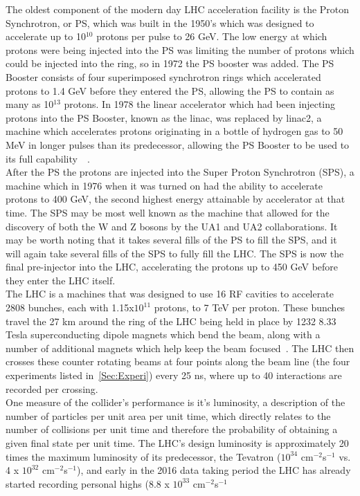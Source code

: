 The oldest component of the modern day LHC acceleration facility is the Proton Synchrotron, or PS, which was built in the 1950's which was designed to accelerate up to 10$^{10}$ protons per pulse to 26 GeV.  
The low energy at which protons were being injected into the PS was limiting the number of protons which could be injected into the ring, so in 1972 the PS booster was added.  
The PS Booster consists of four superimposed synchrotron rings which accelerated protons to 1.4 GeV before they entered the PS, allowing the PS to contain as many as 10$^{13}$ protons.  
In 1978 the linear accelerator which had been injecting protons into the PS Booster, known as the linac, was replaced by linac2, a machine which accelerates protons originating in a bottle of hydrogen gas to 50 MeV in longer pulses than its predecessor, allowing the PS Booster to be used to its full capability~\cite{PSHistory}~\cite{PSHistory2}.  \\

After the PS the protons are injected into the Super Proton Synchrotron (SPS), a machine which in 1976 when it was turned on had the ability to accelerate protons to 400 GeV, the second highest energy attainable by accelerator at that time.  
The SPS may be most well known as the machine that allowed for the discovery of both the W and Z bosons by the UA1 and UA2 collaborations.  
It may be worth noting that it takes several fills of the PS to fill the SPS, and it will again take several fills of the SPS to fully fill the LHC.  
The SPS is now the final pre-injector into the LHC, accelerating the protons up to 450 GeV before they enter the LHC itself.  \\

The LHC is a machines that was designed to use 16 RF cavities to accelerate 2808 bunches, each with 1.15x$10^{11}$ protons, to 7 TeV per proton.  
These bunches travel the 27 km around the ring of the LHC being held in place by 1232 8.33 Tesla superconducting dipole magnets which bend the beam, along with a number of additional magnets which help keep the beam focused~\cite{LHCTDR}.  
The LHC then crosses these counter rotating beams at four points along the beam line (the four experiments listed in~\ref{Sec:Experi}) every 25 ns, where up to 40 interactions are recorded per crossing.  \\

One measure of the collider's performance is it's luminosity, a description of the number of particles per unit area per unit time, which directly relates to the number of collisions per unit time and therefore the probability of obtaining a given final state per unit time.  
The LHC's design luminosity is approximately 20 times the maximum luminosity of its predecessor, the Tevatron ($10^{34}$ cm$^{-2}$s$^{-1}$ vs. 4 x $10^{32}$ cm$^{-2}$s$^{-1}$), and early in the 2016 data taking period the LHC has already started recording personal highs (8.8 x $10^{33}$ cm$^{-2}$s$^{-1}$

